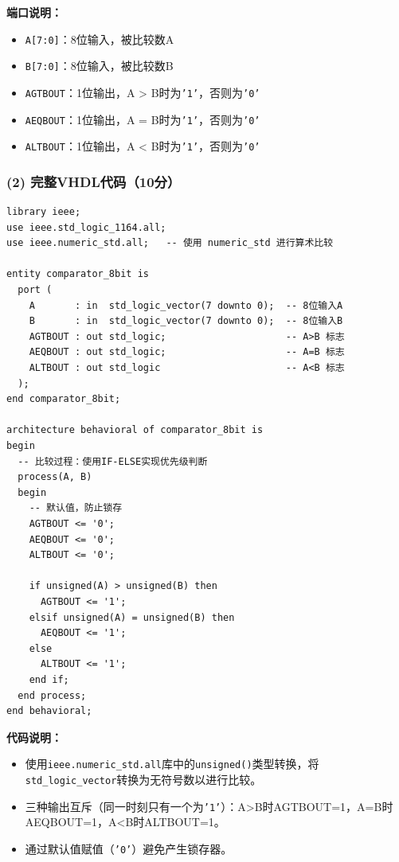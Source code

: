 \noindent\textbf{端口说明：}
\begin{itemize}
  \item \texttt{A[7:0]}：8位输入，被比较数A
  \item \texttt{B[7:0]}：8位输入，被比较数B
  \item \texttt{AGTBOUT}：1位输出，A > B时为\texttt{'1'}，否则为\texttt{'0'}
  \item \texttt{AEQBOUT}：1位输出，A = B时为\texttt{'1'}，否则为\texttt{'0'}
  \item \texttt{ALTBOUT}：1位输出，A < B时为\texttt{'1'}，否则为\texttt{'0'}
\end{itemize}

\subsubsection*{(2) 完整VHDL代码（10分）}

\begin{lstlisting}[caption={8位二进制比较器——完整VHDL代码}, label={lst:ans04_comp}]
library ieee;
use ieee.std_logic_1164.all;
use ieee.numeric_std.all;   -- 使用 numeric_std 进行算术比较

entity comparator_8bit is
  port (
    A       : in  std_logic_vector(7 downto 0);  -- 8位输入A
    B       : in  std_logic_vector(7 downto 0);  -- 8位输入B
    AGTBOUT : out std_logic;                     -- A>B 标志
    AEQBOUT : out std_logic;                     -- A=B 标志
    ALTBOUT : out std_logic                      -- A<B 标志
  );
end comparator_8bit;

architecture behavioral of comparator_8bit is
begin
  -- 比较过程：使用IF-ELSE实现优先级判断
  process(A, B)
  begin
    -- 默认值，防止锁存
    AGTBOUT <= '0';
    AEQBOUT <= '0';
    ALTBOUT <= '0';

    if unsigned(A) > unsigned(B) then
      AGTBOUT <= '1';
    elsif unsigned(A) = unsigned(B) then
      AEQBOUT <= '1';
    else
      ALTBOUT <= '1';
    end if;
  end process;
end behavioral;
\end{lstlisting}

\noindent\textbf{代码说明：}
\begin{itemize}
  \item 使用\texttt{ieee.numeric\_std.all}库中的\texttt{unsigned()}类型转换，将\texttt{std\_logic\_vector}转换为无符号数以进行比较。
  \item 三种输出互斥（同一时刻只有一个为\texttt{'1'}）：A>B时AGTBOUT=1，A=B时AEQBOUT=1，A<B时ALTBOUT=1。
  \item 通过默认值赋值（\texttt{'0'}）避免产生锁存器。
\end{itemize}

